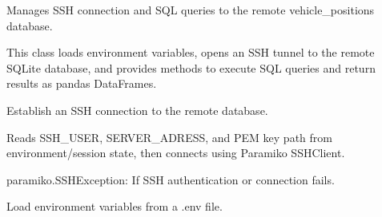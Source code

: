 \documentclass[letterpaper,10pt,english]{sphinxmanual}
\begin{document}
\begin{fulllineitems}
\label{\detokenize{api:managers.request_manager.RequestManager}}
\pysigstartsignatures
{}
\pysigstopsignatures
\sphinxAtStartPar
Manages SSH connection and SQL queries to the remote vehicle\_positions database.

\sphinxAtStartPar
This class loads environment variables, opens an SSH tunnel to the remote SQLite database,
and provides methods to execute SQL queries and return results as pandas DataFrames.

\begin{fulllineitems}
\label{\detokenize{api:managers.request_manager.RequestManager.connect}}
\pysigstartsignatures
{}
\pysigstopsignatures
\sphinxAtStartPar
Establish an SSH connection to the remote database.

\sphinxAtStartPar
Reads SSH\_USER, SERVER\_ADRESS, and PEM key path from environment/session state,
then connects using Paramiko SSHClient.
\begin{description}
\sphinxAtStartPar
paramiko.SSHException: If SSH authentication or connection fails.

\end{description}

\end{fulllineitems}


\begin{fulllineitems}
\label{\detokenize{api:managers.request_manager.RequestManager.load_env}}
\pysigstartsignatures
{}
\pysigstopsignatures
\sphinxAtStartPar
Load environment variables from a .env file.

\end{fulllineitems}



\end{fulllineitems}
\end{document}
